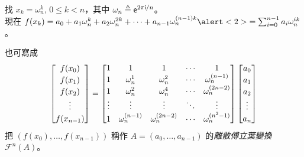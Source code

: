 \documentclass[standalone]{beamer}
\begin{document}
\def\myaddv{\vphantom{\omega_n^{()}}}
\begin{frame}
  找 $x_k = \omega_n^k, \, 0 \leq k < n$，其中 $\omega_n \triangleq \mathsf{e}^{2 \pi \mathsf{i} / n}$。\\
  \pause
  現在 $f(x_k) = a_0 + a_1 \omega_n^k + a_2 \omega_n^{2k} + \dots + a_{n-1} \omega_n^{(n-1)k}
  \alert<2>{= \sum_{i=0}^{n-1} a_i \omega_n^{ik}}$。
  \pause

  也可寫成
  \[ 
    \begin{bmatrix}
      f(x_0) \\ f(x_1) \myaddv \\ f(x_2) \myaddv \\ \vdots \\ f(x_{n-1}) \myaddv
    \end{bmatrix}
    = 
  \begin{bmatrix}
    1 & 1 & 1 & \cdots & 1 \\
    1 & \omega_n^{1} & \omega_n^{2} & \cdots & \omega_n^{(n-1)} \\
    1 & \omega_n^{2} & \omega_n^{4} & \cdots & \omega_n^{(2n-2)} \\
    \vdots & \vdots & \vdots & \ddots & \vdots \\
    1 & \omega_n^{(n-1)} & \omega_n^{(2n-2)} & \cdots & \omega_n^{(n^2-1)} \\
  \end{bmatrix}
    \begin{bmatrix}
      a_0 \\ a_1 \myaddv \\ a_2 \myaddv \\ \vdots \\ a_n \myaddv
    \end{bmatrix}
  \]
  \pause
  把 $(f(x_0), \dots, f(x_{n-1}))$ 稱作 $A = (a_0, \dots, a_{n-1})$ 的\emph{離散傅立葉變換} $\mathcal{F}^n(A)$。
\end{frame}
\def\aat #1#2{\action<alert@#1>{#2}}
\end{document}
